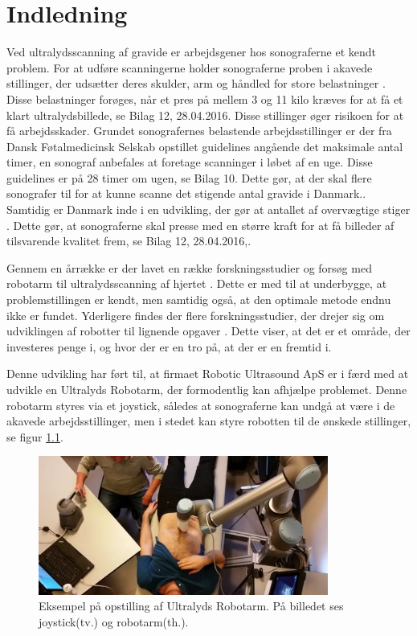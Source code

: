 \chapter{Indledning} 
Ved ultralydsscanning af gravide er arbejdsgener hos sonograferne et kendt problem. For at udføre scanningerne holder sonograferne proben i akavede stillinger, der udsætter deres skulder, arm og håndled for store belastninger \cite{1}\cite{24}\cite{31}\cite{32}\cite{36}. Disse belastninger forøges, når et pres på mellem 3 og 11 kilo kræves for at få et klart ultralydsbillede, se Bilag 12, 28.04.2016. Disse stillinger øger risikoen for at få arbejdsskader. Grundet sonografernes belastende arbejdsstillinger er der fra Dansk Føtalmedicinsk Selskab opstillet guidelines angående det maksimale antal timer, en sonograf anbefales at foretage scanninger i løbet af en uge. Disse guidelines er på 28 timer om ugen, se Bilag 10. Dette gør, at der skal flere sonografer til for at kunne scanne det stigende antal gravide i Danmark.\cite{Foedsler}. \\
Samtidig er Danmark inde i en udvikling, der gør at antallet af overvægtige stiger \cite{Overvaegt}. Dette gør, at sonograferne skal presse med en større kraft for at få billeder af tilsvarende kvalitet frem, se Bilag 12, 28.04.2016,\cite{8}\cite{24}\cite{31}. 

Gennem en årrække er der lavet en række forskningsstudier og forsøg med robotarm til ultralydsscanning af hjertet \cite{5}. Dette er med til at underbygge, at problemstillingen er kendt, men samtidig også, at den optimale metode endnu ikke er fundet. Yderligere findes der flere forskningsstudier, der drejer sig om udviklingen af robotter til lignende opgaver \cite{5}\cite{8}\cite{18}. Dette viser, at det er et område, der investeres penge i, og hvor der er en tro på, at der er en fremtid i. 

Denne udvikling har ført til, at firmaet Robotic Ultrasound ApS er i færd med at udvikle en Ultralyds Robotarm, der formodentlig kan afhjælpe problemet. Denne robotarm styres via et joystick, således at sonograferne kan undgå at være i de akavede arbejdsstillinger, men i stedet kan styre robotten til de ønskede stillinger, se figur \ref{opstilling}.  

\begin{figure}[H]\centering
	\includegraphics[width = 0.85\textwidth]{Figurer/ergonomiskLosning.jpg}
	\caption{Eksempel på opstilling af Ultralyds Robotarm. På billedet ses joystick(tv.) og robotarm(th.).  }
	\label{opstilling}
\end{figure}

